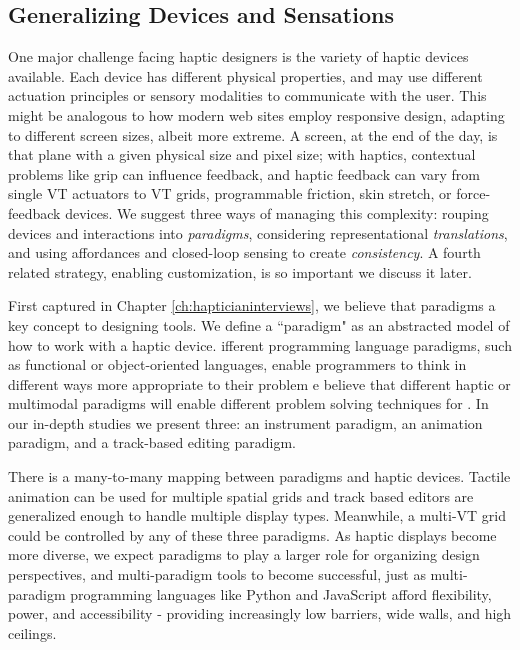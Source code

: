 \subsection{Generalizing Devices and Sensations}
\label{sec:generalizingdevices}
One major challenge facing haptic designers is the variety of haptic devices available.
Each device has different physical properties, and may use different actuation principles or sensory modalities to communicate with the user.
This might be analogous to how modern web sites employ responsive design, adapting to different screen sizes, albeit more extreme.
A screen, at the end of the day, is that plane with a given physical size and pixel size; with haptics,
contextual problems like grip can influence feedback, and haptic feedback can vary from single VT actuators to VT grids, programmable friction, skin stretch, or force-feedback devices.
We suggest three ways of managing this complexity:
rouping devices and interactions into \emph{paradigms},
considering representational \emph{translations}, and
using affordances and closed-loop sensing to create \emph{consistency}.
A fourth related strategy, enabling customization, is so important we discuss it later.

First captured in Chapter \ref{ch:hapticianinterviews}, we believe that paradigms  a key concept to designing \haxd tools.
We define a ``paradigm" as an abstracted model of how to work with a haptic device.
ifferent programming language paradigms, such as functional or object-oriented languages, enable programmers to think in different ways more appropriate to their problem
e believe that different haptic or multimodal paradigms will enable different problem solving techniques for \haxd.
In our in-depth studies we present three: an instrument paradigm, an animation paradigm, and a track-based editing paradigm.

There is a many-to-many mapping between paradigms and haptic devices.
Tactile animation can be used for multiple spatial grids and track based editors are generalized enough to handle multiple display types.
Meanwhile, a multi-VT grid could be controlled by any of these three paradigms.
As haptic displays become more diverse, we expect paradigms to play a larger role for organizing design perspectives, and multi-paradigm tools to become successful, just as multi-paradigm programming languages like Python and JavaScript afford flexibility, power, and accessibility - providing increasingly low barriers, wide walls, and high ceilings.


